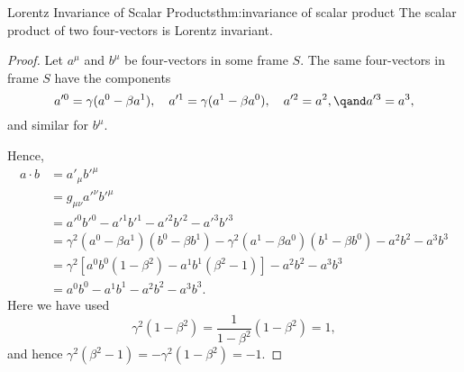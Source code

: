\documentclass[fleqn]{NotesClass}
\begin{document}
    \begin{thm}{Lorentz Invariance of Scalar Products}{thm:invariance of scalar product}
        The scalar product of two four-vectors is Lorentz invariant.
        
        \begin{proof}
            Let \(a^\mu\) and \(b^\mu\) be four-vectors in some frame \(S\).
            The same four-vectors in frame \(S\) have the components
            \begin{equation}
                a'^0 = \gamma(a^0 - \beta a^1), \quad a'^1 = \gamma(a^1 - \beta a^0), \quad a'^2 = a^2, \qand a'^3 = a^3,
            \end{equation}
            and similar for \(b^\mu\).
            
            Hence,
            \begin{align}
                a\cdot b &= a'_\mu b'^\mu\\
                &= g_{\mu\nu}a'^\nu b'^\mu\\
                &= a'^0b'^0 - a'^1b'^1 - a'^2b'^2 - a'^3b'^3\\
                &= \gamma^2(a^0 - \beta a^1)(b^0 - \beta b^1) - \gamma^2(a^1 - \beta a^0)(b^1 - \beta b^0) - a^2b^2 - a^3b^3\\
                &= \gamma^2[a^0b^0(1 - \beta^2) - a^1b^1(\beta^2 - 1)] - a^2b^2 - a^3b^3\\
                &= a^0b^0 - a^1b^1 - a^2b^2 - a^3b^3.
            \end{align}
            Here we have used
            \begin{equation}
                \gamma^2(1 - \beta^2) = \frac{1}{1 - \beta^2}(1 - \beta^2) = 1,
            \end{equation}
            and hence \(\gamma^2(\beta^2 - 1) = -\gamma^2(1 - \beta^2) = -1\).
        \end{proof}
    \end{thm}
    
\end{document}
